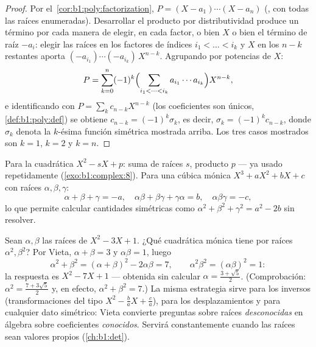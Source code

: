 \begin{proof}
Por el~\cref{cor:b1:poly:factorization},
$P = (X - a_1)\cdots(X - a_n)$ (, con todas las raíces
enumeradas). Desarrollar el producto por distributividad produce un
término por cada manera de elegir, en cada factor, o bien $X$ o bien el
término de raíz $-a_i$: elegir las raíces en los factores de índices
$i_1 < \dots < i_k$ y $X$ en los $n - k$ restantes aporta
$(-a_{i_1})\cdots(-a_{i_k})\,X^{n-k}$. Agrupando por potencias de $X$:
\[
P = \sum_{k=0}^{n} (-1)^k
\Bigl(\sum_{i_1 < \dots < i_k} a_{i_1}\cdots a_{i_k}\Bigr)
X^{n-k} ,
\]
e identificando con $P = \sum_k c_{n-k}X^{n-k}$ (los coeficientes son
únicos, \cref{def:b1:poly:def}) se obtiene $c_{n-k} = (-1)^k \sigma_k$,
es decir, $\sigma_k = (-1)^kc_{n-k}$, donde $\sigma_k$ denota la
$k$-ésima función simétrica mostrada arriba. Los tres casos mostrados
son $k = 1$, $k = 2$ y $k = n$.
\end{proof}

\begin{example}\label{ex:b1:poly:vieta}
Para la cuadrática $X^2 - sX + p$: suma de raíces $s$, producto $p$ ---
ya usado repetidamente (\cref{exo:b1:complex:8}). Para una cúbica
mónica $X^3 + aX^2 + bX + c$ con raíces $\alpha, \beta, \gamma$:
\[
\alpha + \beta + \gamma = -a,
\quad
\alpha\beta + \beta\gamma + \gamma\alpha = b,
\quad
\alpha\beta\gamma = -c ,
\]
lo que permite calcular cantidades simétricas como
$\alpha^2 + \beta^2 + \gamma^2 = a^2 - 2b$ sin resolver.
\end{example}

\begin{example}\label{ex:b1:poly:transformroots}
Sean $\alpha, \beta$ las raíces de $X^2 - 3X + 1$. ¿Qué cuadrática
mónica tiene por raíces $\alpha^2, \beta^2$? Por Vieta,
$\alpha + \beta = 3$ y $\alpha\beta = 1$, luego
\[
\alpha^2 + \beta^2 = (\alpha+\beta)^2 - 2\alpha\beta = 7,
\qquad
\alpha^2\beta^2 = (\alpha\beta)^2 = 1 :
\]
la respuesta es $X^2 - 7X + 1$ --- obtenida sin calcular
$\alpha = \frac{3 + \sqrt5}2$. (Comprobación:
$\alpha^2 = \frac{7 + 3\sqrt5}2$ y, en efecto,
$\alpha^2 + \beta^2 = 7$.) La misma estrategia sirve para los inversos
(transformaciones del tipo $X^2 - \frac ba X + \frac ca$), para los
desplazamientos y para cualquier dato simétrico: Vieta convierte
preguntas sobre raíces \emph{desconocidas} en álgebra sobre
coeficientes \emph{conocidos}. Servirá constantemente cuando las raíces
sean valores propios (\cref{ch:b1:det}).
\end{example}

